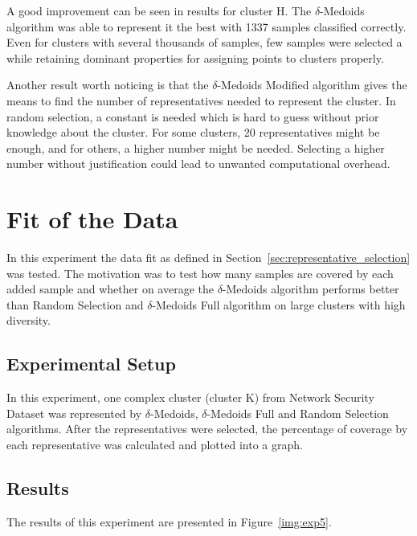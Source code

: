\documentclass[thesis=B,english]{FITthesis}[2012/10/20]
\begin{document}
A good improvement can be seen in results for cluster H.
The $\delta$-Medoids algorithm was able to represent it the best with 1337 samples classified correctly.
Even for clusters with several thousands of samples, few samples were selected a while retaining dominant properties for assigning points to clusters properly.

Another result worth noticing is that the $\delta$-Medoids Modified algorithm gives the means to find the number of representatives needed to represent the cluster.
In random selection, a constant is needed which is hard to guess without prior knowledge about the cluster.
For some clusters, 20 representatives might be enough, and for others, a higher number might be needed.
Selecting a higher number without justification could lead to unwanted computational overhead.

\section{Fit of the Data}\label{sec:exp5}

In this experiment the data fit as defined in Section~\ref{sec:representative_selection} was tested.
The motivation was to test how many samples are covered by each added sample and whether on average the $\delta$-Medoids algorithm performs better than Random Selection and $\delta$-Medoids Full algorithm on large clusters with high diversity.

\subsection{Experimental Setup}
In this experiment, one complex cluster (cluster K) from Network Security Dataset was represented by $\delta$-Medoids, $\delta$-Medoids Full and Random Selection algorithms.
After the representatives were selected, the percentage of coverage by each representative was calculated and plotted into a graph.

\subsection{Results}
The results of this experiment are presented in Figure~\ref{img:exp5}.
\end{document}
